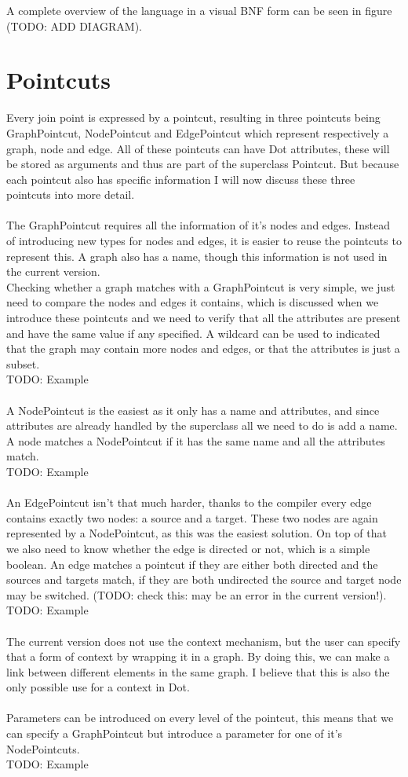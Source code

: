 \documentclass[a4paper]{report}
\begin{document}
A complete overview of the language in a visual BNF form can be seen in figure (TODO: ADD DIAGRAM).

\section{Pointcuts}
Every join point is expressed by a pointcut, resulting in three pointcuts being GraphPointcut, NodePointcut and EdgePointcut which represent respectively a graph, node and edge. All of these pointcuts can have Dot attributes, these will be stored as arguments and thus are part of the superclass Pointcut. But because each pointcut also has specific information I will now discuss these three pointcuts into more detail.\\
\\
The GraphPointcut requires all the information of it's nodes and edges. Instead of introducing new types for nodes and edges, it is easier to reuse the pointcuts to represent this. A graph also has a name, though this information is not used in the current version.\\
Checking whether a graph matches with a GraphPointcut is very simple, we just need to compare the nodes and edges it contains, which is discussed when we introduce these pointcuts and we need to verify that all the attributes are present and have the same value if any specified. A wildcard can be used to indicated that the graph may contain more nodes and edges, or that the attributes is just a subset.\\
TODO: Example\\
\\
A NodePointcut is the easiest as it only has a name and attributes, and since attributes are already handled by the superclass all we need to do is add a name. A node matches a NodePointcut if it has the same name and all the attributes match.\\
TODO: Example\\
\\
An EdgePointcut isn't that much harder, thanks to the compiler every edge contains exactly two nodes: a source and a target. These two nodes are again represented by a NodePointcut, as this was the easiest solution. On top of that we also need to know whether the edge is directed or not, which is a simple boolean. An edge matches a pointcut if they are either both directed and the sources and targets match, if they are both undirected the source and target node may be switched. (TODO: check this: may be an error in the current version!).\\
TODO: Example\\
\\
The current version does not use the context mechanism, but the user can specify that a form of context by wrapping it in a graph. By doing this, we can make a link between different elements in the same graph. I believe that this is also the only possible use for a context in Dot.\\
\\
Parameters can be introduced on every level of the pointcut, this means that we can specify a GraphPointcut but introduce a parameter for one of it's NodePointcuts.\\
TODO: Example
\end{document}
